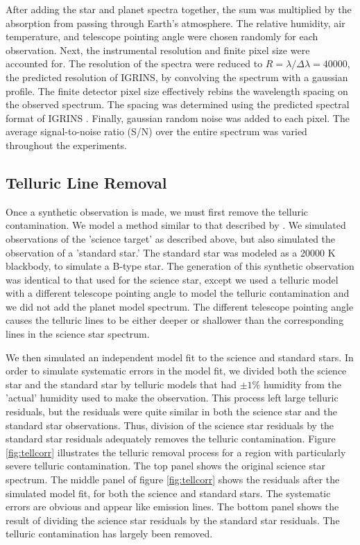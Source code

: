 \documentclass[11pt]{report}     %
\begin{document}
After adding the star and planet spectra together, the sum
was multiplied by the absorption from passing through Earth's
atmosphere. The relative humidity, air temperature, and telescope pointing angle were chosen randomly for each observation. Next, the instrumental
resolution and finite pixel size were accounted for. The resolution of
the spectra were reduced to $R=\lambda / \Delta \lambda = 40000$, the
predicted resolution of IGRINS, by convolving the spectrum with a
gaussian profile. The finite detector pixel size effectively rebins the wavelength
spacing on the observed spectrum. The spacing was
determined using the predicted spectral format of IGRINS
\citep[Figures 2 and 3 of ][]{IGRINS}. Finally, gaussian random noise
was added to each pixel. The average signal-to-noise ratio (S/N) over
the entire spectrum was varied throughout the experiments.


\subsection{Telluric Line Removal}
\label{sec:tellcorr}
Once a synthetic observation is made, we must first remove the
telluric contamination. We model a method similar to that described by
\cite{Mandell2011}. We simulated observations of the 'science target'
as described above, but also simulated the observation of a 'standard
star.' The standard star was modeled as a 20000 K blackbody, to
simulate a B-type star. The generation of this synthetic observation
was identical to that used for the science star, except we used a
telluric model with a different telescope pointing angle to model the
telluric contamination and we did not add the planet model spectrum. 
The different telescope pointing angle causes the telluric lines to be 
either deeper or shallower than the corresponding lines in the science star spectrum. 

We then simulated an independent model fit to the science and standard
stars. In order to simulate systematic errors in the model fit, we 
divided both the science star and the standard star by telluric models 
that had $\pm 1\%$ humidity from the 'actual' humidity used to make the
observation. This process left large telluric residuals, but the residuals were
quite similar in both the science star and the standard star
observations. Thus, division of the science star residuals by the
standard star residuals adequately removes the telluric
contamination. Figure \ref{fig:tellcorr} illustrates the telluric
removal process for a region with particularly severe telluric
contamination. The top panel shows the original science star
spectrum. The middle panel of figure \ref{fig:tellcorr} shows the
residuals after the simulated model fit, for both the science and
standard stars. The systematic errors are
obvious and appear like emission lines. The bottom panel
shows the result of dividing the science star residuals by the
standard star residuals. The telluric contamination has largely
been removed.
\end{document}
